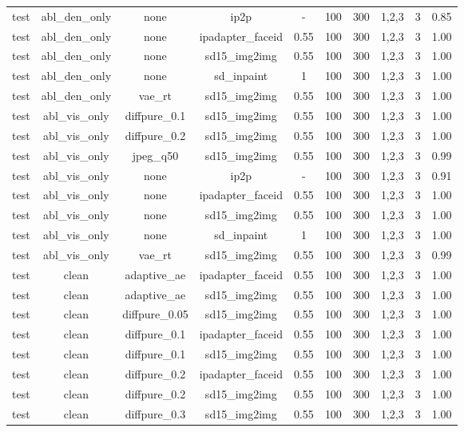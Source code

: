 \begin{table}[t]
{\begin{tabular}{lccccccccc}
test & abl\_den\_only & none & ip2p & - & 100 & 300 & 1,2,3 & 3 & 0.85 \\
test & abl\_den\_only & none & ipadapter\_faceid & 0.55 & 100 & 300 & 1,2,3 & 3 & 1.00 \\
test & abl\_den\_only & none & sd15\_img2img & 0.55 & 100 & 300 & 1,2,3 & 3 & 1.00 \\
test & abl\_den\_only & none & sd\_inpaint & 1 & 100 & 300 & 1,2,3 & 3 & 1.00 \\
test & abl\_den\_only & vae\_rt & sd15\_img2img & 0.55 & 100 & 300 & 1,2,3 & 3 & 1.00 \\
test & abl\_vis\_only & diffpure\_0.1 & sd15\_img2img & 0.55 & 100 & 300 & 1,2,3 & 3 & 1.00 \\
test & abl\_vis\_only & diffpure\_0.2 & sd15\_img2img & 0.55 & 100 & 300 & 1,2,3 & 3 & 1.00 \\
test & abl\_vis\_only & jpeg\_q50 & sd15\_img2img & 0.55 & 100 & 300 & 1,2,3 & 3 & 0.99 \\
test & abl\_vis\_only & none & ip2p & - & 100 & 300 & 1,2,3 & 3 & 0.91 \\
test & abl\_vis\_only & none & ipadapter\_faceid & 0.55 & 100 & 300 & 1,2,3 & 3 & 1.00 \\
test & abl\_vis\_only & none & sd15\_img2img & 0.55 & 100 & 300 & 1,2,3 & 3 & 1.00 \\
test & abl\_vis\_only & none & sd\_inpaint & 1 & 100 & 300 & 1,2,3 & 3 & 1.00 \\
test & abl\_vis\_only & vae\_rt & sd15\_img2img & 0.55 & 100 & 300 & 1,2,3 & 3 & 0.99 \\
test & clean & adaptive\_ae & ipadapter\_faceid & 0.55 & 100 & 300 & 1,2,3 & 3 & 1.00 \\
test & clean & adaptive\_ae & sd15\_img2img & 0.55 & 100 & 300 & 1,2,3 & 3 & 1.00 \\
test & clean & diffpure\_0.05 & sd15\_img2img & 0.55 & 100 & 300 & 1,2,3 & 3 & 1.00 \\
test & clean & diffpure\_0.1 & ipadapter\_faceid & 0.55 & 100 & 300 & 1,2,3 & 3 & 1.00 \\
test & clean & diffpure\_0.1 & sd15\_img2img & 0.55 & 100 & 300 & 1,2,3 & 3 & 1.00 \\
test & clean & diffpure\_0.2 & ipadapter\_faceid & 0.55 & 100 & 300 & 1,2,3 & 3 & 1.00 \\
test & clean & diffpure\_0.2 & sd15\_img2img & 0.55 & 100 & 300 & 1,2,3 & 3 & 1.00 \\
test & clean & diffpure\_0.3 & sd15\_img2img & 0.55 & 100 & 300 & 1,2,3 & 3 & 1.00 \\

\end{tabular}}
\end{table}
